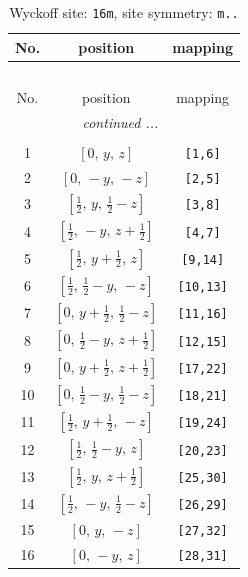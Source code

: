 \documentclass[fleqn,8pt]{jsarticle}
\begin{document}
\renewcommand{\arraystretch}{1.2}
\begin{longtable}{ccc}
\caption{Wyckoff site: {\tt 16m}, site symmetry: {\tt m..}}
 \\
 \hline \hline
No. & position & mapping \\ \hline \endfirsthead

\multicolumn{2}{l}{\tablename\ \thetable{}} \\
 \hline \hline
No. & position & mapping \\ \hline \endhead

 \hline \hline
\multicolumn{2}{r}{\footnotesize\it continued ...} \\ \endfoot

 \hline \hline
\multicolumn{2}{r}{} \\ \endlastfoot

1 & $\left[ 0,\, y,\, z \right]$ & {\tt [1,6]} \\ \hline
2 & $\left[ 0,\, - y,\, - z \right]$ & {\tt [2,5]} \\ \hline
3 & $\left[ \frac{1}{2},\, y,\, \frac{1}{2} - z \right]$ & {\tt [3,8]} \\ \hline
4 & $\left[ \frac{1}{2},\, - y,\, z + \frac{1}{2} \right]$ & {\tt [4,7]} \\ \hline
5 & $\left[ \frac{1}{2},\, y + \frac{1}{2},\, z \right]$ & {\tt [9,14]} \\ \hline
6 & $\left[ \frac{1}{2},\, \frac{1}{2} - y,\, - z \right]$ & {\tt [10,13]} \\ \hline
7 & $\left[ 0,\, y + \frac{1}{2},\, \frac{1}{2} - z \right]$ & {\tt [11,16]} \\ \hline
8 & $\left[ 0,\, \frac{1}{2} - y,\, z + \frac{1}{2} \right]$ & {\tt [12,15]} \\ \hline
9 & $\left[ 0,\, y + \frac{1}{2},\, z + \frac{1}{2} \right]$ & {\tt [17,22]} \\ \hline
10 & $\left[ 0,\, \frac{1}{2} - y,\, \frac{1}{2} - z \right]$ & {\tt [18,21]} \\ \hline
11 & $\left[ \frac{1}{2},\, y + \frac{1}{2},\, - z \right]$ & {\tt [19,24]} \\ \hline
12 & $\left[ \frac{1}{2},\, \frac{1}{2} - y,\, z \right]$ & {\tt [20,23]} \\ \hline
13 & $\left[ \frac{1}{2},\, y,\, z + \frac{1}{2} \right]$ & {\tt [25,30]} \\ \hline
14 & $\left[ \frac{1}{2},\, - y,\, \frac{1}{2} - z \right]$ & {\tt [26,29]} \\ \hline
15 & $\left[ 0,\, y,\, - z \right]$ & {\tt [27,32]} \\ \hline
16 & $\left[ 0,\, - y,\, z \right]$ & {\tt [28,31]} \\
\end{longtable}
\end{document}
